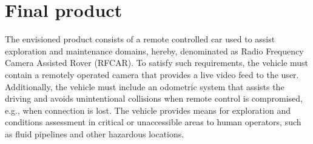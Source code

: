 \chapter{Final product}%
\label{ch:final-product}
The envisioned product consists of a remote controlled car used to assist
exploration and maintenance domains, hereby, denominated as Radio Frequency
Camera Assisted Rover (RFCAR). To satisfy such requirements, the vehicle must
contain a remotely operated camera that provides a live video feed to the user.
Additionally, the vehicle must include an odometric system that assists the
driving and avoids unintentional collisions when remote control is compromised, e.g., when connection is lost.
The vehicle provides means for exploration and conditions assessment in critical
or unaccessible areas to human operators, such as fluid pipelines and other
hazardous locations.
%
